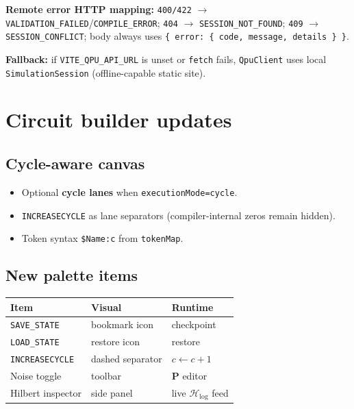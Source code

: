 \documentclass[11pt,a4paper]{article}
\newcommand{\HS}{\mathcal{H}_{\mathrm{log}}}
\begin{document}
\textbf{Remote error HTTP mapping:} \texttt{400/422} $\rightarrow$ \texttt{VALIDATION\_FAILED}/\texttt{COMPILE\_ERROR}; \texttt{404} $\rightarrow$ \texttt{SESSION\_NOT\_FOUND}; \texttt{409} $\rightarrow$ \texttt{SESSION\_CONFLICT}; body always uses \texttt{\{ error: \{ code, message, details \} \}}.

\textbf{Fallback:} if \texttt{VITE\_QPU\_API\_URL} is unset or \texttt{fetch} fails, \texttt{QpuClient} uses local \texttt{SimulationSession} (offline-capable static site).

\section{Circuit builder updates}

\subsection{Cycle-aware canvas}

\begin{itemize}
  \item Optional \textbf{cycle lanes} when \texttt{executionMode=cycle}.
  \item \texttt{INCREASECYCLE} as lane separators (compiler-internal zeros remain hidden).
  \item Token syntax \texttt{\$Name:c} from \texttt{tokenMap}.
\end{itemize}

\subsection{New palette items}

\begin{center}
\begin{tabular}{@{}lll@{}}
\toprule
Item & Visual & Runtime \\
\midrule
\texttt{SAVE\_STATE} & bookmark icon & checkpoint \\
\texttt{LOAD\_STATE} & restore icon & restore \\
\texttt{INCREASECYCLE} & dashed separator & $c\gets c+1$ \\
Noise toggle & toolbar & $\mathbf{P}$ editor \\
Hilbert inspector & side panel & live $\HS$ feed \\
\bottomrule
\end{tabular}
\end{center}
\end{document}
